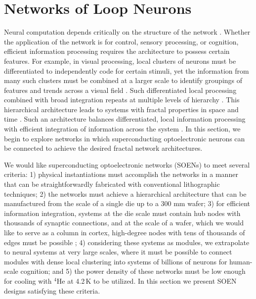 \documentclass[aip,amsmath,amssymb,reprint,nofootinbib]{revtex4-1}
\begin{document}
\section{\label{sec:networks}Networks of Loop Neurons}
Neural computation depends critically on the structure of the network \cite{spto2000}. Whether the application of the network is for control, sensory processing, or cognition, efficient information processing requires the architecture to possess certain features. For example, in visual processing, local clusters of neurons must be differentiated to independently code for certain stimuli, yet the information from many such clusters must be combined at a larger scale to identify groupings of features and trends across a visual field \cite{haah2017}. Such differentiated local processing combined with broad integration repeats at multiple levels of hierarchy \cite{stsa2000,budr2004}. This hierarchical architecture leads to systems with fractal properties in space and time \cite{bu2006,busp2009}. Such an architecture balances differentiated, local information processing with efficient integration of information across the system \cite{to2004}. In this section, we begin to explore networks in which superconducting optoelectronic neurons can be connected to achieve the desired fractal network architectures.

We would like superconducting optoelectronic networks (SOENs) to meet several criteria: 1) physical instantiations must accomplish the networks in a manner that can be straightforwardly fabricated with conventional lithographic techniques; 2) the networks must achieve a hierarchical architecture that can be manufactured from the scale of a single die up to a 300 mm wafer; 3) for efficient information integration, systems at the die scale must contain hub nodes with thousands of synaptic connections, and at the scale of a wafer, which we would like to serve as a column in cortex, high-degree nodes with tens of thousands of edges must be possible \cite{sh2018ICRC}; 4) considering these systems as modules, we extrapolate to neural systems at very large scales, where it must be possible to connect modules with dense local clustering into systems of billions of neurons for human-scale cognition; and 5) the power density of these networks must be low enough for cooling with $^4$He at 4.2\,K to be utilized. In this section we present SOEN designs satisfying these criteria.
	
\end{document}
